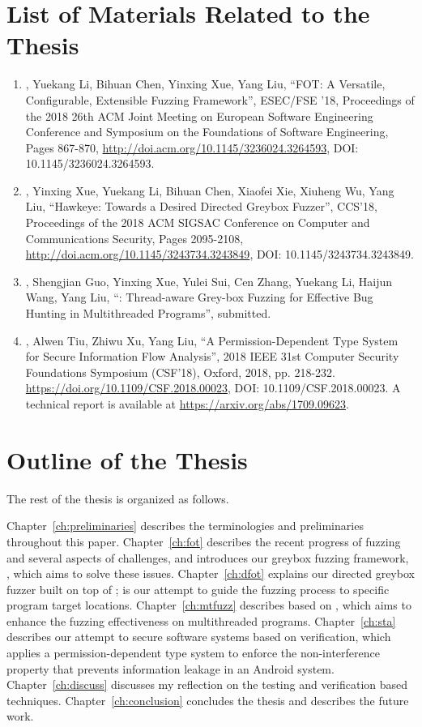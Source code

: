 \section{List of Materials Related to the Thesis}
\begin{enumerate}
	\item \myname, Yuekang Li, Bihuan Chen, Yinxing Xue, Yang Liu, ``FOT: A Versatile, Configurable, Extensible Fuzzing Framework'', ESEC/FSE '18, Proceedings of the 2018 26th ACM Joint Meeting on European Software Engineering Conference and Symposium on the Foundations of Software Engineering, Pages 867-870, \url{http://doi.acm.org/10.1145/3236024.3264593}, DOI: 10.1145/3236024.3264593.
	\item \myname, Yinxing Xue, Yuekang Li, Bihuan Chen, Xiaofei Xie, Xiuheng Wu, Yang Liu, ``Hawkeye: Towards a Desired Directed Greybox Fuzzer'', CCS'18, Proceedings of the 2018 ACM SIGSAC Conference on Computer and Communications Security, Pages 2095-2108, \url{http://doi.acm.org/10.1145/3243734.3243849}, DOI: 10.1145/3243734.3243849.
	\item \myname, Shengjian Guo, Yinxing Xue, Yulei Sui, Cen Zhang, Yuekang Li, Haijun Wang, Yang Liu, ``\mtfuzz: Thread-aware Grey-box Fuzzing for Effective Bug Hunting in Multithreaded Programs'', submitted.
	\item \myname, Alwen Tiu, Zhiwu Xu, Yang Liu, ``A Permission-Dependent Type System for Secure Information Flow Analysis'', 2018 IEEE 31st Computer Security Foundations Symposium (CSF'18), Oxford, 2018, pp. 218-232. \url{https://doi.org/10.1109/CSF.2018.00023}, DOI: 10.1109/CSF.2018.00023. A technical report is available at \url{https://arxiv.org/abs/1709.09623}.
\end{enumerate}

\section{Outline of the Thesis}

The rest of the thesis is organized as follows.

Chapter~\ref{ch:preliminaries} describes the terminologies and preliminaries throughout this paper. Chapter~\ref{ch:fot} describes the recent progress of fuzzing and several aspects of challenges, and introduces our greybox fuzzing framework, \FOT, which aims to solve these issues. Chapter~\ref{ch:dfot} explains our directed greybox fuzzer \dFOT built on top of \FOT; \dFOT is our attempt to guide the fuzzing process to specific program target locations. Chapter~\ref{ch:mtfuzz} describes \mtfuzz based on \FOT, which aims to enhance the fuzzing effectiveness on multithreaded programs. Chapter~\ref{ch:sta} describes our attempt to secure software systems based on verification, which applies a permission-dependent type system to enforce the non-interference property that prevents information leakage in an Android system. Chapter~\ref{ch:discuss} discusses my reflection on the testing and verification based techniques. Chapter~\ref{ch:conclusion} concludes the thesis and describes the future work.